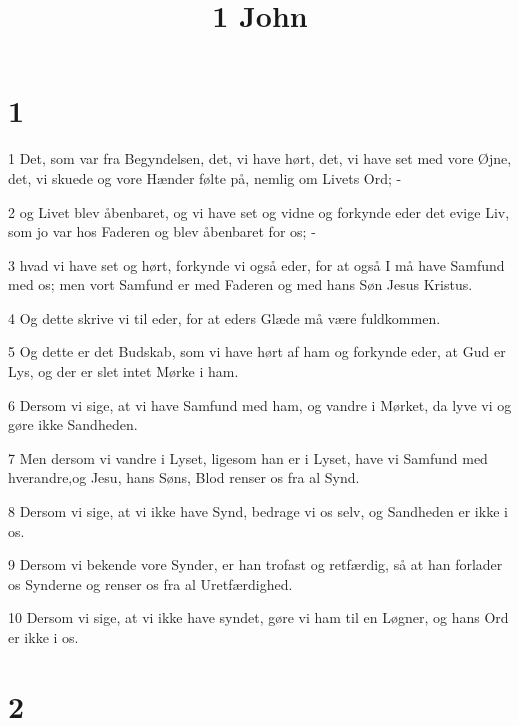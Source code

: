 

\title{1 John}


\chapter{1}

\par 1 Det, som var fra Begyndelsen, det, vi have hørt, det, vi have set med vore Øjne, det, vi skuede og vore Hænder følte på, nemlig om Livets Ord; -
\par 2 og Livet blev åbenbaret, og vi have set og vidne og forkynde eder det evige Liv, som jo var hos Faderen og blev åbenbaret for os; -
\par 3 hvad vi have set og hørt, forkynde vi også eder, for at også I må have Samfund med os; men vort Samfund er med Faderen og med hans Søn Jesus Kristus.
\par 4 Og dette skrive vi til eder, for at eders Glæde må være fuldkommen.
\par 5 Og dette er det Budskab, som vi have hørt af ham og forkynde eder, at Gud er Lys, og der er slet intet Mørke i ham.
\par 6 Dersom vi sige, at vi have Samfund med ham, og vandre i Mørket, da lyve vi og gøre ikke Sandheden.
\par 7 Men dersom vi vandre i Lyset, ligesom han er i Lyset, have vi Samfund med hverandre,og Jesu, hans Søns, Blod renser os fra al Synd.
\par 8 Dersom vi sige, at vi ikke have Synd, bedrage vi os selv, og Sandheden er ikke i os.
\par 9 Dersom vi bekende vore Synder, er han trofast og retfærdig, så at han forlader os Synderne og renser os fra al Uretfærdighed.
\par 10 Dersom vi sige, at vi ikke have syndet, gøre vi ham til en Løgner, og hans Ord er ikke i os.

\chapter{2}

